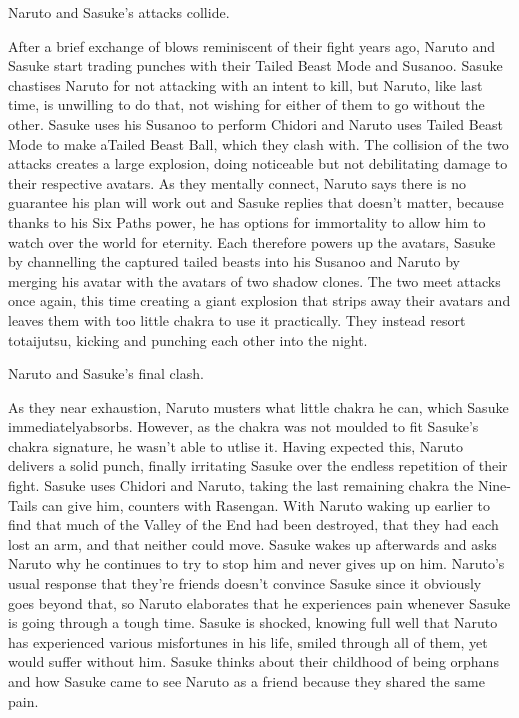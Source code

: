 \documentclass[a4paper,12pt]{article}
\begin{document}
Naruto and Sasuke's attacks collide.\\ \par \vspace{0.5cm}

After a brief exchange of blows reminiscent of their fight years ago, Naruto and Sasuke start trading punches with their Tailed Beast Mode and Susanoo. Sasuke chastises Naruto for not attacking with an intent to kill, but Naruto, like last time, is unwilling to do that, not wishing for either of them to go without the other. Sasuke uses his Susanoo to perform Chidori and Naruto uses Tailed Beast Mode to make aTailed Beast Ball, which they clash with. The collision of the two attacks creates a large explosion, doing noticeable but not debilitating damage to their respective avatars. As they mentally connect, Naruto says there is no guarantee his plan will work out and Sasuke replies that doesn't matter, because thanks to his Six Paths power, he has options for immortality to allow him to watch over the world for eternity. Each therefore powers up the avatars, Sasuke by channelling the captured tailed beasts into his Susanoo and Naruto by merging his avatar with the avatars of two shadow clones. The two meet attacks once again, this time creating a giant explosion that strips away their avatars and leaves them with too little chakra to use it practically. They instead resort totaijutsu, kicking and punching each other into the night.\\ \par \vspace{0.5cm}

Naruto and Sasuke's final clash.\\ \par \vspace{0.5cm}

As they near exhaustion, Naruto musters what little chakra he can, which Sasuke immediatelyabsorbs. However, as the chakra was not moulded to fit Sasuke's chakra signature, he wasn't able to utlise it. Having expected this, Naruto delivers a solid punch, finally irritating Sasuke over the endless repetition of their fight. Sasuke uses Chidori and Naruto, taking the last remaining chakra the Nine-Tails can give him, counters with Rasengan. With Naruto waking up earlier to find that much of the Valley of the End had been destroyed, that they had each lost an arm, and that neither could move. Sasuke wakes up afterwards and asks Naruto why he continues to try to stop him and never gives up on him. Naruto's usual response that they're friends doesn't convince Sasuke since it obviously goes beyond that, so Naruto elaborates that he experiences pain whenever Sasuke is going through a tough time. Sasuke is shocked, knowing full well that Naruto has experienced various misfortunes in his life, smiled through all of them, yet would suffer without him. Sasuke thinks about their childhood of being orphans and how Sasuke came to see Naruto as a friend because they shared the same pain.\\ \par \vspace{0.5cm}
\end{document}
